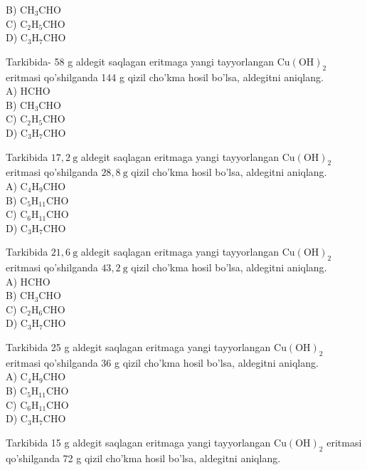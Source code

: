 B) $\mathrm{CH}_{3} \mathrm{CHO}$\\
C) $\mathrm{C}_{2} \mathrm{H}_{5} \mathrm{CHO}$\\
D) $\mathrm{C}_{3} \mathrm{H}_{7} \mathrm{CHO}$
  \item Tarkibida- 58 g aldegit saqlagan eritmaga yangi tayyorlangan $\mathrm{Cu}(\mathrm{OH})_{2}$ eritmasi qo'shilganda 144 g qizil cho'kma hosil bo'lsa, aldegitni aniqlang.\\
A) HCHO\\
B) $\mathrm{CH}_{3} \mathrm{CHO}$\\
C) $\mathrm{C}_{2} \mathrm{H}_{5} \mathrm{CHO}$\\
D) $\mathrm{C}_{3} \mathrm{H}_{7} \mathrm{CHO}$
  \item Tarkibida $17,2 \mathrm{~g}$ aldegit saqlagan eritmaga yangi tayyorlangan $\mathrm{Cu}(\mathrm{OH})_{2}$ eritmasi qo'shilganda $28,8 \mathrm{~g}$ qizil cho'kma hosil bo'lsa, aldegitni aniqlang.\\
A) $\mathrm{C}_{4} \mathrm{H}_{9} \mathrm{CHO}$\\
B) $\mathrm{C}_{5} \mathrm{H}_{11} \mathrm{CHO}$\\
C) $\mathrm{C}_{6} \mathrm{H}_{11} \mathrm{CHO}$\\
D) $\mathrm{C}_{3} \mathrm{H}_{7} \mathrm{CHO}$
  \item Tarkibida $21,6 \mathrm{~g}$ aldegit saqlagan eritmaga yangi tayyorlangan $\mathrm{Cu}(\mathrm{OH})_{2}$ eritmasi qo'shilganda $43,2 \mathrm{~g}$ qizil cho'kma hosil bo'lsa, aldegitni aniqlang.\\
A) HCHO\\
B) $\mathrm{CH}_{3} \mathrm{CHO}$\\
C) $\mathrm{C}_{2} \mathrm{H}_{6} \mathrm{CHO}$\\
D) $\mathrm{C}_{3} \mathrm{H}_{7} \mathrm{CHO}$
  \item Tarkibida 25 g aldegit saqlagan eritmaga yangi tayyorlangan $\mathrm{Cu}(\mathrm{OH})_{2}$\\
eritmasi qo'shilganda 36 g qizil cho'kma hosil bo'lsa, aldegitni aniqlang.\\
A) $\mathrm{C}_{4} \mathrm{H}_{9} \mathrm{CHO}$\\
B) $\mathrm{C}_{5} \mathrm{H}_{11} \mathrm{CHO}$\\
C) $\mathrm{C}_{6} \mathrm{H}_{11} \mathrm{CHO}$\\
D) $\mathrm{C}_{3} \mathrm{H}_{7} \mathrm{CHO}$
  \item Tarkibida 15 g aldegit saqlagan eritmaga yangi tayyorlangan $\mathrm{Cu}(\mathrm{OH})_{2}$ eritmasi qo'shilganda 72 g qizil cho'kma hosil bo'lsa, aldegitni aniqlang.\\
